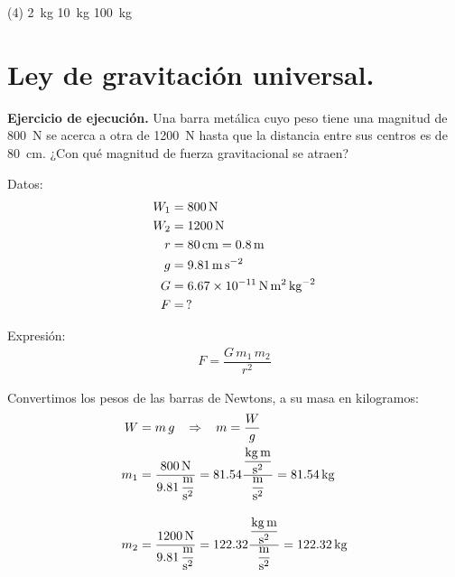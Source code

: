 \documentclass[12pt, letter]{exam}
\begin{document}
\begin{questions}
    \begin{tasks}(4)
        \task \SI{2}{\kilo\gram}
        \task \SI{10}{\kilo\gram}
        \task \SI{100}{\kilo\gram}
        \task {}
    \end{tasks}

    \section{Ley de gravitación universal.}

    \setcounter{question}{17} \question \label{Ejercicio_11} \textbf{Ejercicio de ejecución. } Una barra metálica cuyo peso tiene una magnitud de \SI{800}{\newton} se acerca a otra de \SI{1200}{\newton} hasta que la distancia entre sus centros es de \SI{80}{\centi\meter}. ¿Con qué magnitud de fuerza gravitacional se atraen?

    \begin{minipage}[t]{0.35\linewidth}
    Datos: 
    \begin{align*}
    W_{1} &= \SI{800}{\newton} \\
    W_{2} &= \SI{1200}{\newton} \\
    r &= \SI{80}{\centi\meter} = \SI{0.8}{\meter} \\
    g &= \SI{9.81}{\meter\per\square\second} \\
    G &= \SI{6.67d-11}{\newton\square\meter\per\square\kilo\gram} \\
    F &= \, ?
    \end{align*}
    \end{minipage}
    \hspace{1cm}
    \begin{minipage}[t]{0.4\linewidth}
    Expresión:
    \begin{align*}
    F = \dfrac{G \, m_{1} \, m_{2}}{r^{2}}
    \end{align*}
    \end{minipage}

    Convertimos los pesos de las barras de Newtons, a su masa en kilogramos:
    \begin{align*}
    W &= m \, g \hspace{0.3cm} \Rightarrow \hspace{0.3cm} m = \dfrac{W}{g} \\
    m_{1} &= \dfrac{\SI{800}{\newton}}{\displaystyle \SI[per-mode=fraction]{9.81}{\meter\per\square\second}} = \num{81.54} \dfrac{\displaystyle \unit[per-mode=fraction]{\kilo\gram\meter\per\square\second}}{\displaystyle \unit[per-mode=fraction]{\meter\per\square\second}} = \SI{81.54}{\kilo\gram} \\[1em]
    m_{2} &= \dfrac{\SI{1200}{\newton}}{\displaystyle \SI[per-mode=fraction]{9.81}{\meter\per\square\second}} = \num{122.32} \dfrac{\displaystyle \unit[per-mode=fraction]{\kilo\gram\meter\per\square\second}}{\displaystyle \unit[per-mode=fraction]{\meter\per\square\second}} = \SI{122.32}{\kilo\gram}
    \end{align*}


\end{questions}
\end{document}
